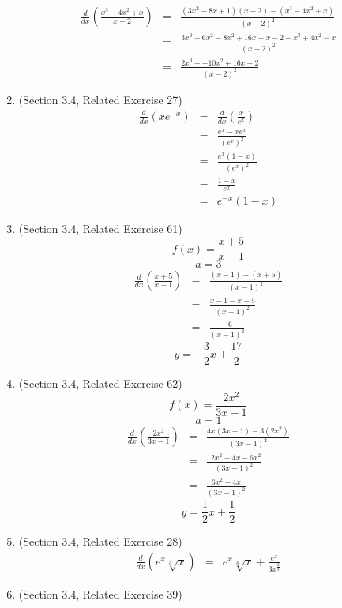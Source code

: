 \documentclass{article}
\begin{document}
\begin{enumerate}
\begin{eqnarray}
            \frac{d}{dx}\left(\frac{x^3-4x^2+x}{x-2}\right) &=& \frac{(3x^2 - 8x + 1)(x-2) - (x^3 - 4x^2 + x)}{(x-2)^2} \\
            &=& \frac{3x^3 - 6x^2 - 8x^2 + 16x + x - 2 - x^3 + 4x^2 - x}{(x-2)^2} \\
            &=& \frac{2x^3 + -10x^2 + 16x - 2}{(x-2)^2}
        \end{eqnarray}
    \item (Section 3.4, Related Exercise 27)
        \begin{eqnarray}
            \frac{d}{dx}\left(xe^{-x}\right) &=& \frac{d}{dx}\left(\frac{x}{e^x}\right) \\
            &=& \frac{e^x - xe^x}{\left(e^x\right)^2} \\
            &=& \frac{e^x(1 - x)}{\left(e^x\right)^2} \\
            &=& \frac{1 - x}{e^x} \\
            &=& e^{-x}\left(1 - x\right)
        \end{eqnarray}
    \item (Section 3.4, Related Exercise 61)
        $$f(x) = \frac{x + 5}{x - 1}$$
        $$a = 3$$
        \begin{eqnarray}
            \frac{d}{dx}\left(\frac{x+5}{x-1}\right) &=& \frac{(x-1) - (x+5)}{(x-1)^2} \\
            &=& \frac{x - 1 - x - 5}{(x-1)^2} \\
            &=& \frac{- 6}{(x-1)^2}
        \end{eqnarray}
        $$y = - \frac{3}{2}x + \frac{17}{2}$$
    \item (Section 3.4, Related Exercise 62)
        $$f(x) = \frac{2x^2}{3x - 1}$$
        $$a = 1$$
        \begin{eqnarray}
            \frac{d}{dx}\left(\frac{2x^2}{3x - 1}\right) &=& \frac{4x(3x - 1) - 3(2x^2)}{(3x - 1)^2} \\
            &=& \frac{12x^2 - 4x - 6x^2}{(3x - 1)^2} \\
            &=& \frac{6x^2 - 4x}{(3x - 1)^2}
        \end{eqnarray}
        $$y = \frac{1}{2}x + \frac{1}{2}$$
    \item (Section 3.4, Related Exercise 28)
        \begin{eqnarray}
            \frac{d}{dx}\left(e^x \sqrt[3]{x}\right) &=& e^x \sqrt[3]{x} + \frac{e^x}{3x^{\frac{2}{3}}}
        \end{eqnarray}
    \item (Section 3.4, Related Exercise 39)

\end{enumerate}
\end{document}
